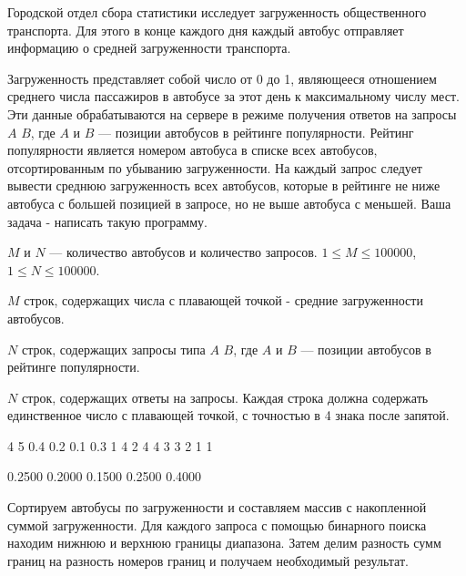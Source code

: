 
Городской отдел сбора статистики исследует загруженность общественного транспорта. Для этого в конце каждого дня каждый автобус отправляет информацию о средней загруженности транспорта.

Загруженность представляет собой число от 0 до 1, являющееся отношением среднего числа пассажиров в автобусе за этот день к максимальному числу мест. Эти данные обрабатываются на сервере в режиме получения ответов на запросы $A$ $B$, где $A$ и $B$ — позиции автобусов в рейтинге популярности. Рейтинг популярности является номером автобуса в списке всех автобусов, отсортированным по убыванию загруженности. На каждый запрос следует вывести среднюю загруженность всех автобусов, которые в рейтинге не ниже автобуса с большей позицией в запросе, но не выше автобуса с меньшей. Ваша задача - написать такую программу.


$M$ и $N$ — количество автобусов и количество запросов. $1 \leq M \leq 100000$, $1 \leq N \leq 100000$.

$M$ строк, содержащих числа с плавающей точкой - средние загруженности автобусов.

$N$ строк, содержащих запросы типа $A$ $B$, где $A$ и $B$ — позиции автобусов в рейтинге популярности.

\outputfmtSection

$N$ строк, содержащих ответы на запросы. Каждая строка должна содержать единственное число с плавающей точкой, с точностью в 4 знака после запятой.


\begin{myverbbox}[\small]{\vinput}
    4 5
    0.4
    0.2
    0.1
    0.3
    1 4
    2 4
    4 3
    3 2
    1 1
\end{myverbbox}
\begin{myverbbox}[\small]{\voutput}
    0.2500
    0.2000
    0.1500
    0.2500
    0.4000
\end{myverbbox}

\solutionSection

Сортируем автобусы по загруженности и составляем массив с накопленной суммой загруженности. Для каждого запроса с помощью бинарного поиска находим нижнюю и верхнюю границы диапазона. Затем делим разность сумм границ на разность номеров границ и получаем необходимый результат.

